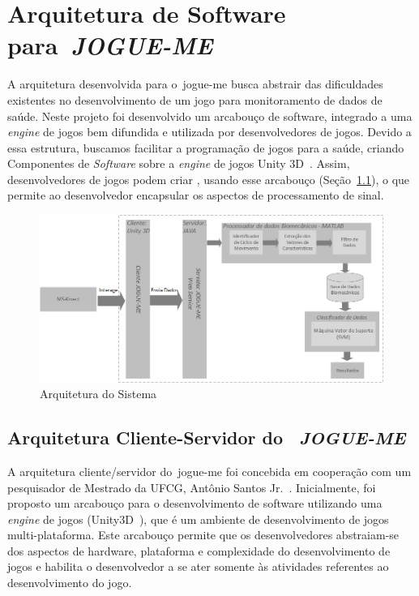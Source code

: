 \chapter{Arquitetura de Software para~\textit{JOGUE-ME}}\label{chapter:arquitetura_captura}

A arquitetura desenvolvida para o~\ac{jogue-me} busca abstrair das dificuldades existentes no desenvolvimento de um jogo para monitoramento de dados de saúde. Neste projeto foi desenvolvido um arcabouço de software, integrado a uma \textit{engine} de jogos bem difundida e utilizada por desenvolvedores de jogos. Devido a essa estrutura, buscamos facilitar a programação de jogos para a saúde, criando Componentes de \textit{Software} sobre a \textit{engine} de jogos Unity 3D~\cite{unity3d}. Assim, desenvolvedores de jogos podem criar , usando esse arcabouço (Seção~\ref{sec:cliente_game}), o que permite ao desenvolvedor encapsular os aspectos de processamento de sinal. 


\begin{figure}[!htbp]
 \centering
  \includegraphics[scale=0.56]{./img/arquitetura.png}
\caption[Arquitetura do Sistema]{Arquitetura do Sistema}
 \label{fig:arquitetura}
\end{figure}

\section{Arquitetura Cliente-Servidor do ~\textit{JOGUE-ME}}\label{sec:cliente_game}
A arquitetura cliente/servidor do~\ac{jogue-me} foi concebida em cooperação com um pesquisador de Mestrado da UFCG, Antônio Santos Jr.~\cite{antonio2013}. Inicialmente, foi proposto um arcabouço para o desenvolvimento de software utilizando uma \textit{engine} de jogos (Unity3D~\cite{unity3d}), que é um ambiente de desenvolvimento de jogos multi-plataforma. Este arcabouço permite que os desenvolvedores abstraiam-se dos aspectos de hardware, plataforma e complexidade do desenvolvimento de jogos e habilita o desenvolvedor a se ater somente às atividades referentes ao desenvolvimento do jogo.

